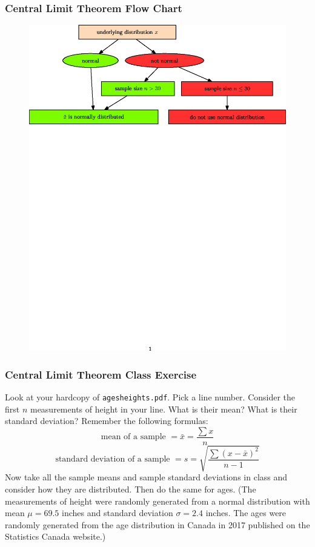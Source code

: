 \documentclass[xcolor=dvipsnames]{beamer}
\begin{document}
\begin{frame}
  \frametitle{Central Limit Theorem Flow Chart}
\begin{figure}[h]
\includegraphics[scale=.7]{./diagrams/CentralLimitTheorem.eps}
\end{figure}
\end{frame}

\begin{frame}
  \frametitle{Central Limit Theorem Class Exercise}
Look at your hardcopy of \texttt{agesheights.pdf}. Pick a line number.
Consider the first $n$ measurements of height in your line. What is
their mean? What is their standard deviation? Remember the following
formulas:
  \begin{equation}
    \label{eq:daechuev}
    \mbox{mean of a sample }=\bar{x}=\frac{\sum{}x}{n}
  \end{equation}
\begin{equation}
  \label{eq:xeiroong}
   \mbox{standard deviation of a sample }=s=\sqrt{\frac{\sum{}(x-\bar{x})^{2}}{n-1}}
\end{equation}
Now take all the sample means and sample standard deviations in class
and consider how they are distributed. Then do the same for ages. (The
measurements of height were randomly generated from a normal
distribution with mean $\mu=69.5$ inches and standard deviation
$\sigma=2.4$ inches. The ages were randomly generated from the age
distribution in Canada in 2017 published on the Statistics Canada
website.)
\end{frame}
\end{document}
